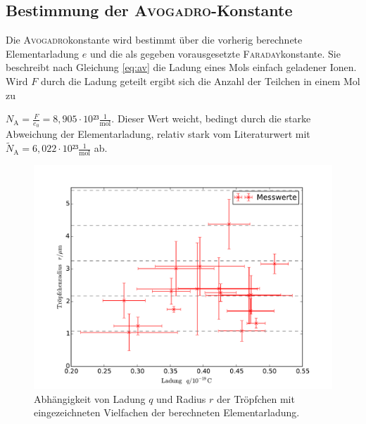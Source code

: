 \subsection{Bestimmung der \textsc{Avogadro}-Konstante}

Die \textsc{Avogadro}konstante wird bestimmt über die vorherig berechnete Elementarladung $e$ und die als gegeben vorausgesetzte \textsc{Faraday}konstante. Sie beschreibt nach Gleichung \eqref{eq:av} die Ladung eines Mols einfach geladener Ionen. Wird $F$ durch die Ladung geteilt ergibt sich die Anzahl der Teilchen in einem Mol zu

$N_\mathup{A}=\frac{F}{e_0}=8,905\cdot10²³\frac{1}{\si\mol}$. Dieser Wert weicht, bedingt durch die starke Abweichung der Elementarladung, relativ stark vom Literaturwert mit $\tilde{N}_\mathup{A}=6,022\cdot10²³\frac{1}{\si\mol}$ ab.




\begin{figure}
	\centering
	\includegraphics[width=\textwidth]{Bilder/plot_messwerte+.pdf}
	\caption{Abhängigkeit von Ladung $q$ und Radius $r$ der Tröpfchen mit eingezeichneten Vielfachen der berechneten Elementarladung.}
	\label{fig:label1}
\end{figure}

